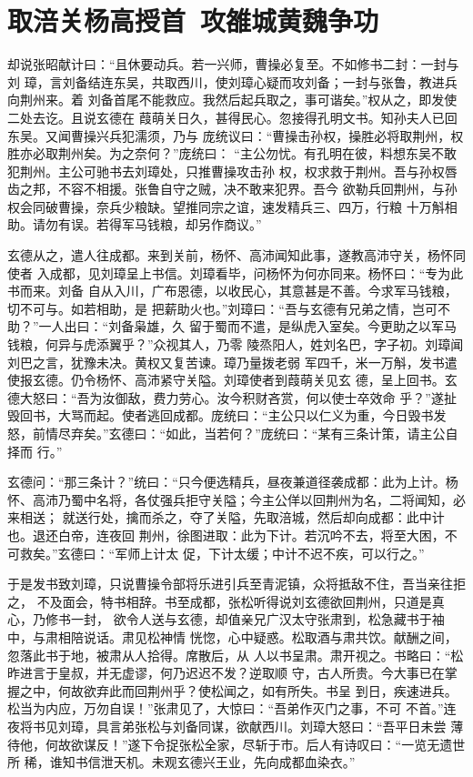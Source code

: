 \chapter{取涪关杨高授首~攻雒城黄魏争功}

却说张昭献计曰：“且休要动兵。若一兴师，曹操必复至。不如修书二封：一封与刘
璋，言刘备结连东吴，共取西川，使刘璋心疑而攻刘备；一封与张鲁，教进兵向荆州来。着
刘备首尾不能救应。我然后起兵取之，事可谐矣。”权从之，即发使二处去讫。且说玄德在
葭萌关日久，甚得民心。忽接得孔明文书。知孙夫人已回东吴。又闻曹操兴兵犯濡须，乃与
庞统议曰：“曹操击孙权，操胜必将取荆州，权胜亦必取荆州矣。为之奈何？”庞统曰：
“主公勿忧。有孔明在彼，料想东吴不敢犯荆州。主公可驰书去刘璋处，只推曹操攻击孙
权，权求救于荆州。吾与孙权唇齿之邦，不容不相援。张鲁自守之贼，决不敢来犯界。吾今
欲勒兵回荆州，与孙权会同破曹操，奈兵少粮缺。望推同宗之谊，速发精兵三、四万，行粮
十万斛相助。请勿有误。若得军马钱粮，却另作商议。”

玄德从之，遣人往成都。来到关前，杨怀、高沛闻知此事，遂教高沛守关，杨怀同使者
入成都，见刘璋呈上书信。刘璋看毕，问杨怀为何亦同来。杨怀曰：“专为此书而来。刘备
自从入川，广布恩德，以收民心，其意甚是不善。今求军马钱粮，切不可与。如若相助，是
把薪助火也。”刘璋曰：“吾与玄德有兄弟之情，岂可不助？”一人出曰：“刘备枭雄，久
留于蜀而不遣，是纵虎入室矣。今更助之以军马钱粮，何异与虎添翼乎？”众视其人，乃零
陵烝阳人，姓刘名巴，字子初。刘璋闻刘巴之言，犹豫未决。黄权又复苦谏。璋乃量拨老弱
军四千，米一万斛，发书遣使报玄德。仍令杨怀、高沛紧守关隘。刘璋使者到葭萌关见玄
德，呈上回书。玄德大怒曰：“吾为汝御敌，费力劳心。汝今积财吝赏，何以使士卒效命
乎？”遂扯毁回书，大骂而起。使者逃回成都。庞统曰：“主公只以仁义为重，今日毁书发
怒，前情尽弃矣。”玄德曰：“如此，当若何？”庞统曰：“某有三条计策，请主公自择而
行。”

玄德问：“那三条计？”统曰：“只今便选精兵，昼夜兼道径袭成都：此为上计。杨
怀、高沛乃蜀中名将，各仗强兵拒守关隘；今主公佯以回荆州为名，二将闻知，必来相送；
就送行处，擒而杀之，夺了关隘，先取涪城，然后却向成都：此中计也。退还白帝，连夜回
荆州，徐图进取：此为下计。若沉吟不去，将至大困，不可救矣。”玄德曰：“军师上计太
促，下计太缓；中计不迟不疾，可以行之。”

于是发书致刘璋，只说曹操令部将乐进引兵至青泥镇，众将抵敌不住，吾当亲往拒之，
不及面会，特书相辞。书至成都，张松听得说刘玄德欲回荆州，只道是真心，乃修书一封，
欲令人送与玄德，却值亲兄广汉太守张肃到，松急藏书于袖中，与肃相陪说话。肃见松神情
恍惚，心中疑惑。松取酒与肃共饮。献酬之间，忽落此书于地，被肃从人拾得。席散后，从
人以书呈肃。肃开视之。书略曰：“松昨进言于皇叔，并无虚谬，何乃迟迟不发？逆取顺
守，古人所贵。今大事已在掌握之中，何故欲弃此而回荆州乎？使松闻之，如有所失。书呈
到日，疾速进兵。松当为内应，万勿自误！”张肃见了，大惊曰：“吾弟作灭门之事，不可
不首。”连夜将书见刘璋，具言弟张松与刘备同谋，欲献西川。刘璋大怒曰：“吾平日未尝
薄待他，何故欲谋反！”遂下令捉张松全家，尽斩于市。后人有诗叹曰：“一览无遗世所
稀，谁知书信泄天机。未观玄德兴王业，先向成都血染衣。”

